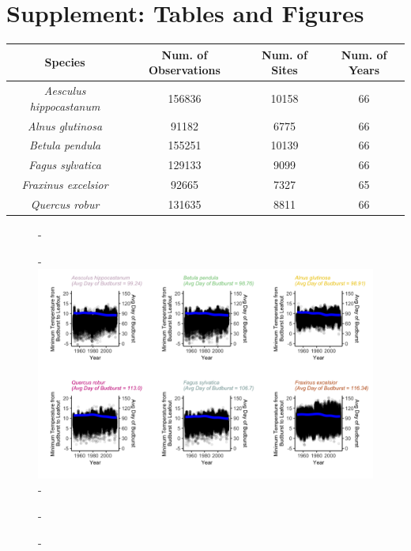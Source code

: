 \documentclass{article}\usepackage[]{graphicx}\usepackage[]{color}
\begin{document}
\section*{Supplement: Tables and Figures}
  
\begin{center}
 \label{tab:spp} 
\begin{tabular}{c c c c}
\hline
\textbf{Species} & \textbf{Num. of Observations} & \textbf{Num. of Sites} & \textbf{Num. of Years} \\
\hline
\textit{Aesculus hippocastanum} & 156836 & 10158 & 66  \\
\hline
\textit{Alnus glutinosa} & 91182 & 6775 & 66 \\
\hline
\textit{Betula pendula} & 155251 & 10139 & 66 \\
\hline
\textit{Fagus sylvatica} & 129133 & 9099 & 66 \\
\hline
\textit{Fraxinus excelsior} & 92665 & 7327 & 65 \\
\hline
\textit{Quercus robur} & 131635  & 8811 & 66 \\
\end{tabular}
\end{center}

{\begin{figure} [H]
  -\begin{center}
  -\includegraphics[width=12cm]{..//figures/TminBB_bySpp.png}
  -\caption{}\label{fig:tmin}
  -\end{center}
  -\end{figure}}
  
\end{document}
